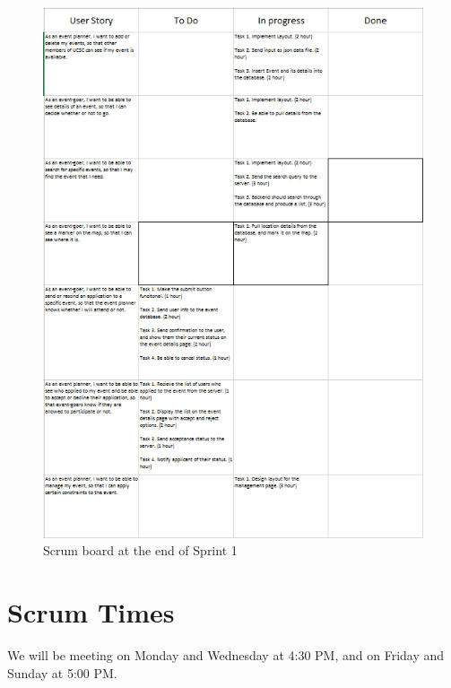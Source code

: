 \documentclass[10pt]{article}
\newcommand{\fancysecX}[2] {{\color{primary}\section*{#1} \label{sec:#2}}}
\begin{document}
   \begin{figure}[!ht]
  	\caption{Scrum board at the end of Sprint 1}
  	\centering
    		\includegraphics[width=1\textwidth]{scrumboard2Initial}
\end{figure}

\fancysecX{Scrum Times}{scrumTimes}

    We will be meeting on Monday and Wednesday at 4:30 PM, and on Friday and Sunday at 5:00 PM.
\end{document}
